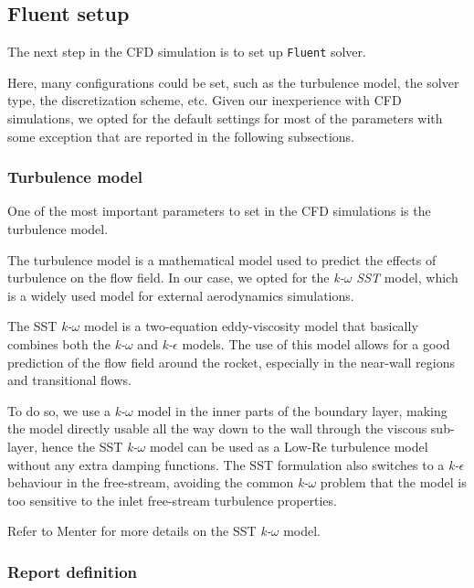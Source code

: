 \subsection{Fluent setup}
\label{subsec:fluent_setup}

The next step in the CFD simulation is to set up \texttt{Fluent} solver.

Here, many configurations could be set, such as the turbulence model, the solver type, the discretization scheme, etc.
Given our inexperience with CFD simulations, we opted for the default settings for most of the parameters with some exception that are reported in the following subsections.


\subsubsection{Turbulence model}
\label{subsubsec:turbulence_model}

One of the most important parameters to set in the CFD simulations is the turbulence model.

The turbulence model is a mathematical model used to predict the effects of turbulence on the flow field.
In our case, we opted for the \textit{k-$\omega$ SST} model, which is a widely used model for external aerodynamics simulations.

The SST \textit{k-$\omega$} model is a two-equation eddy-viscosity model that basically combines both the \textit{k-$\omega$} and \textit{k-$\epsilon$} models.
The use of this model allows for a good prediction of the flow field around the rocket, especially in the near-wall regions and transitional flows.

To do so, we use a \textit{k-$\omega$} model in the inner parts of the boundary layer, making the model directly usable all the way down to the wall through the viscous sub-layer, hence the SST \textit{k-$\omega$} model can be used as a Low-Re turbulence model without any extra damping functions.
The SST formulation also switches to a \textit{k-$\epsilon$} behaviour in the free-stream, avoiding the common \textit{k-$\omega$} problem that the model is too sensitive to the inlet free-stream turbulence properties.

Refer to Menter \cite{Menter1994TwoequationET} for more details on the SST \textit{k-$\omega$} model.


\subsubsection{Report definition}
\label{subsubsec:report_definition}


